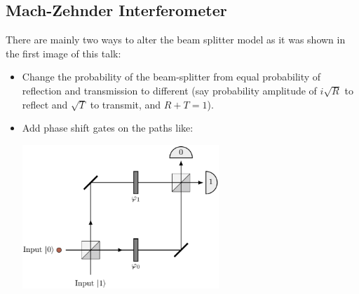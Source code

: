 \documentclass[12pt]{article}
\begin{document}
\subsection{Mach-Zehnder Interferometer}
There are mainly two ways to alter the beam splitter model as it was shown in the first image of this talk:
\begin{itemize}
    \item Change the probability of the beam-splitter from equal probability of reflection and transmission to different (say probability amplitude of $i\sqrt{R}$ to reflect and $\sqrt{T}$ to transmit, and $R + T = 1$).
    \item Add phase shift gates on the paths like:
    \begin{center}
        \includegraphics[width = 20em ]{images/4.jpg}
    \end{center}
\end{itemize}
\end{document}
